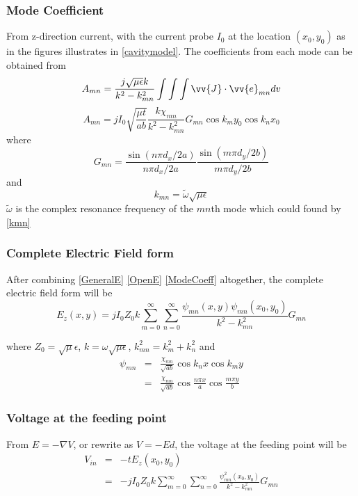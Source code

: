   \subsubsection{Mode Coefficient}
    \indent From z-direction current, with the current probe $I_{0}$ at the location $(x_0,y_0)$ as in the
            figures illustrates in \ref{cavitymodel}. The coefficients from each mode can be obtained from
    \begin{equation}
      A_{mn} = \frac{j\sqrt{\mu\epsilon}k}{k^2-k_{mn}^2} \int\int\int\vv{J} \cdot \vv{e}_{mn} dv
    \end{equation}
    \begin{equation}
      \label{ModeCoeff}
      A_{mn} = jI_0 \sqrt{\frac{\mu t}{ab}} \frac{k\chi_{mn}}{k^2-k_{mn}^2} G_{mn} \cos{k_my_0}\cos{k_nx_0}
    \end{equation}
    \indent where
    \begin{equation}
      G_{mn} = \frac{\sin(n\pi d_x/2a)}{n\pi d_x/2a}\frac{\sin(m\pi d_y/2b)}{m\pi d_y/2b}
    \end{equation}
    \indent and
    \begin{equation}
      k_{mn} = \widetilde{\omega}\sqrt{\mu\epsilon}
    \end{equation}
    \indent $\widetilde{\omega}$ is the complex resonance frequency of the $mn$th mode which could found by \ref{kmn}

    \subsubsection{Complete Electric Field form}
      \indent After combining \ref{GeneralE} \ref{OpenE} \ref{ModeCoeff} altogether, the complete electric field form will be
      \begin{equation}
        E_z(x,y) = jI_0Z_0k \sum_{m=0}^{\infty} \sum_{n=0}^{\infty} \frac{\psi_{mn}(x,y)\psi_{mn}(x_0,y_0)}{k^2-k_{mn}^2}G_{mn}
      \end{equation}
    
      \indent where $Z_0 = \sqrt{\mu}{\epsilon}$, $k = \omega\sqrt{\mu\epsilon}$, $k_{mn}^2 = k_{m}^2 + k_{n}^2$ and
      \begin{eqnarray}
        \psi_{mn} &=& \frac{\chi_{mn}}{\sqrt{ab}}\cos{k_nx}\cos{k_my} \nonumber \\
                  &=& \frac{\chi_{mn}}{\sqrt{ab}}\cos{\frac{n\pi x}{a}}\cos{\frac{m\pi y}{b}}
      \end{eqnarray}
    \subsubsection{Voltage at the feeding point}
      \indent From $E = - \nabla V$, or rewrite as $V = -Ed$, the voltage at the feeding point will be
      \begin{eqnarray}
          V_{in} &=& -tE_z(x_0,y_0) \nonumber \\
                &=& -jI_0Z_0k \sum_{m=0}^{\infty} \sum_{n=0}^{\infty} \frac{\psi_{mn}^2(x_0,y_0)}{k^2-k_{mn}^2} G_{mn}
      \end{eqnarray}
